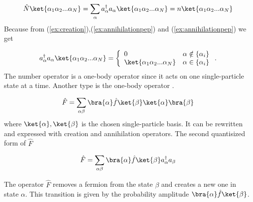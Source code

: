 \begin{equation}
\hat{N} \ket{\alpha_1 \alpha_2... \alpha_N} = \sum_\alpha a_{\alpha}^\dagger a_{\alpha} \ket{\alpha_1 \alpha_2... \alpha_N} = n  \ket{\alpha_1 \alpha_2... \alpha_N} 
 \label{def:numberoperatorstate}
\end{equation}
%
Because from  (\ref{ex:creation}),(\ref{ex:annihilationpep}) and (\ref{ex:annihilationpep}) we get 

\begin{equation}
 a_{\alpha}^\dagger a_{\alpha} \ket{\alpha_1 \alpha_2... \alpha_N}= \left\{ \begin{array}{ll}
 0 & \mbox{$\alpha \notin \{\alpha_i\}$} \\
  \ket{\alpha_1 \alpha_2... \alpha_N} & \mbox{$\alpha \in \{\alpha_i\}$}
       \end{array} \right..
 \label{def:becausenumberoperators}
\end{equation}
% 
The number operator is a one-body operator since it acts on one single-particle state at a time. Another type is the one-body operator \cite{bartlett}.

\begin{equation}
\hat{F} = \sum_{\alpha \beta} \bra{\alpha} \hat{f} \ket{\beta} \ket{\alpha}\bra{\beta}
 \label{def:onebodyoperator}
\end{equation}
%
where $\ket{\alpha},\ket{\beta}$ is the chosen single-particle basis. It can be rewritten and expressed with creation and annihilation operators. The second quantisized form of $\hat{F}$

\begin{equation}
\hat{F} = \sum_{\alpha \beta} \bra{\alpha} \hat{f} \ket{\beta} a_{\alpha}^\dagger a_{\beta}
 \label{def:rewrittenonebodyoperator}
\end{equation}





The operator $\hat{F}$ removes a fermion from the state $\beta$ and creates a new one in state $\alpha$. This transition is given by the probability amplitude $\bra{\alpha}\hat{f}\ket{\beta}$.

